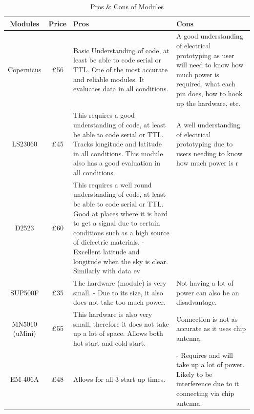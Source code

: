\documentclass[12pt,a4paper]{article}
\begin{document}
\begin{appendices}
      \begin{table}[H]
        \centering
          \begin{tabularx}{\textwidth}{ccXX}
            \hline
            Modules  & Price & Pros & Cons   \\
            \hline
            Copernicus  & £56 & Basic Understanding of code, at least be able to code serial or TTL. One of the most accurate and reliable modules. It evaluates data in all conditions.   & A good understanding of electrical prototyping as user will need to know how much power is required, what each pin does, how to hook up the hardware, etc.   \\\hline
            LS23060  & £45 & This requires a good understanding of code, at least be able to code serial or TTL. Tracks longitude and latitude in all conditions. This module also has a good evaluation in all conditions.   & A well understanding of electrical prototyping due to users needing to know how much power is r\\\hline
            D2523  & £60  & This requires a well round understanding of code, at least be able to code serial or TTL. Good at places where it is hard to get a signal due to certain conditions such as a high source of dielectric materials. - Excellent latitude and longitude when the sky is clear. Similarly with data ev\\\hline
            SUP500F  & £35 & The hardware (module) is very small. - Due to its size, it also does not take too much power. &  Not having a lot of power can also be an disadvantage. \\\hline
            MN5010 (uMini) & £55 & This hardware is also very small, therefore it does not take up a lot of space. Allows both hot start and cold start. & Connection is not as accurate as it uses chip antenna. \\\hline
            EM-406A  & £48 & Allows for all 3 start up times.  & - Requires and will take up a lot of power. Likely to be interference due to it connecting via chip antenna.  \\
            \hline
          \end{tabularx}
        \caption{Pros \& Cons of Modules} 
      \end{table} 


\end{appendices}
\end{document}

